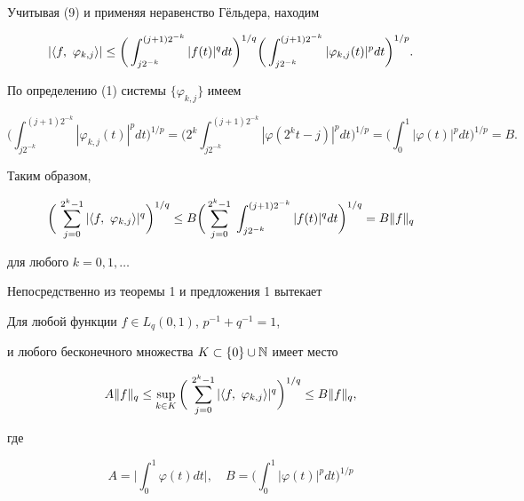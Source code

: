  


\begin{pf} Учитывая (9) и применяя неравенство Г\"ельдера, находим 


$$ 


|\la f,\ \varphi_{k,j}\ra|\le\bigg( 


\int^{(j+1)2^{-k}}_{j2^{-k}}|f(t)|^q dt\bigg)^{1/q}\bigg( 


\int^{(j+1)2^{-k}}_{j2^{-k}}|\varphi_{k,j}(t)|^p dt\bigg)^{1/p}. 


$$ 


По определению (1) системы $\{\varphi_{k,j}\}$ имеем 


$$ 


\bigg(\int^{(j+1)2^{-k}}_{j2^{-k}} 


|\varphi_{k,j}(t)|^p dt\bigg)^{1/p}=\bigg(2^k 


\int^{(j+1)2^{-k}}_{j2^{-k}} 


|\varphi(2^k t-j)|^p dt\bigg)^{1/p}=\bigg(\int^1_0 


|\varphi(t)|^p dt\bigg)^{1/p}=B. 


$$ 


Таким образом, 


$$ 


\bigg(\,\sum^{2^k-1}_{j=0}|\la f,\ \varphi_{k,j}\ra|^q 


\bigg)^{1/q}\le B\bigg(\sum^{2^k-1}_{j=0}\; 


\int^{(j+1)2^{-k}}_{j2^{-k}} 


|f(t)|^q dt\bigg)^{1/q}=B\|f\|_q 


$$ 


для любого $k=0,1,\dotsc$ 


\end{pf} 


 


Непосредственно из теоремы 1 и предложения 1 вытекает 


 


\begin{cor} Для любой функции $f\in L_q(0,1)$, $p^{-1}+q^{-1}=1$, 


и любого бесконечного множества $K\subset\{0\}\cup\Bbb N$ имеет место 


\begin{equation} 


A\|f\|_q\le\sup_{k\in K}\bigg(\,\sum^{2^k-1}_{j=0} 


|\la f,\ \varphi_{k,j}\ra|^q\bigg)^{1/q} 


\le B\|f\|_q, 


\end{equation} 


где 


$$ 


A=\bigg|\int^1_0\varphi(t)dt\bigg|,\quad 


B=\bigg(\int^1_0|\varphi(t)|^p dt\bigg)^{1/p} 


$$ 


\end{cor} 


